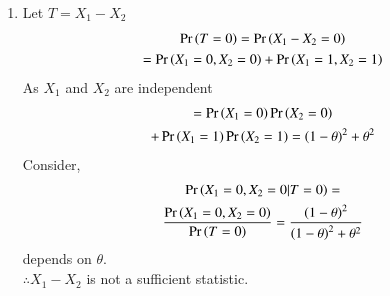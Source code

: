 \documentclass[journal,12pt,twocolumn]{IEEEtran}
\begin{document}
\begin{enumerate}
    
    \item Let $T=X_1-X_2$
    \begin{multline}
        \Pr\left(T=0\right)=\Pr\left(X_1-X_2=0\right)\\=\Pr\left(X_1=0,X_2=0\right)+\Pr\left(X_1=1,X_2=1\right)
    \end{multline}
    As $X_1$ and $X_2$ are independent
    \begin{multline}
        =\Pr\left(X_1=0\right)\Pr\left(X_2=0\right)\\+\Pr\left(X_1=1\right)\Pr\left(X_2=1\right)=\left(1-\theta\right)^2 + \theta^2
    \end{multline}
    Consider,
    \begin{multline}
        \Pr\left(X_1=0,X_2=0 | T=0\right) = \\\frac{\Pr\left(X_1=0,X_2=0\right)}{\Pr\left(T=0\right)}
        =\frac{\left(1-\theta\right)^2}{\left(1-\theta\right)^2 + \theta^2}
    \end{multline}
    depends on $\theta$. \\
    $\therefore X_1-X_2$ is not a sufficient statistic.
    

\end{enumerate}
\end{document}
